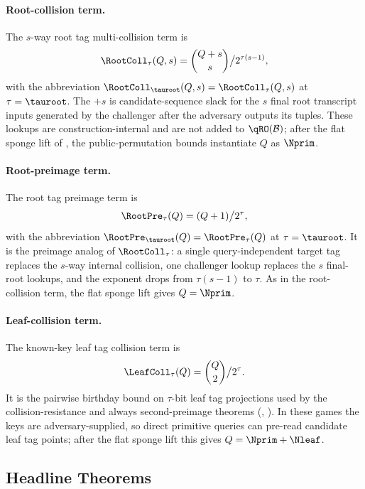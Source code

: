 \paragraph{Root-collision term.}
The $s$-way root tag multi-collision term is
\[
  \RootColl_\tau(Q, s) = \binom{Q + s}{s} \big/ 2^{\tau (s - 1)},
\]
with the abbreviation $\RootColl_{\tauroot}(Q, s) =
\RootColl_\tau(Q, s)$ at $\tau = \tauroot$. The $+s$ is candidate-sequence
slack for the $s$ final root transcript inputs generated by the
challenger after the adversary outputs its tuples. These lookups are
construction-internal and are not added to $\qRO(\mathcal{B})$; after the
flat sponge lift of , the public-permutation
bounds instantiate $Q$ as $\Nprim$.

\paragraph{Root-preimage term.}
The root tag preimage term is
\[
  \RootPre_\tau(Q) = (Q + 1) \big/ 2^{\tau},
\]
with the abbreviation $\RootPre_{\tauroot}(Q) = \RootPre_\tau(Q)$ at
$\tau = \tauroot$. It is the preimage analog of $\RootColl_\tau$: a
single query-independent target tag replaces the $s$-way internal
collision, one challenger lookup replaces the $s$ final-root lookups,
and the exponent drops from $\tau(s-1)$ to $\tau$. As in the
root-collision term, the flat sponge lift gives $Q = \Nprim$.

\paragraph{Leaf-collision term.}
The known-key leaf tag collision term is
\[
  \LeafColl_\tau(Q) = \binom{Q}{2} \big/ 2^\tau.
\]
It is the pairwise birthday bound on $\tau$-bit leaf tag projections
used by the collision-resistance and always second-preimage theorems
(, ). In these games the keys are
adversary-supplied, so direct primitive queries can pre-read candidate
leaf tag points; after the flat sponge lift this gives
$Q=\Nprim+\Nleaf$.

\subsection{Headline Theorems}
\label{sec:headline}

